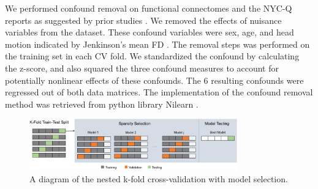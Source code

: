 We performed confound removal on functional connectomes and the NYC-Q reports as suggested by prior studies \cite{Smith2015}.
We removed the effects of nuisance variables from the dataset. These confound variables were sex, age, and head motion indicated by Jenkinson’s mean FD \cite{Jenkinson2002}.%
The removal steps was performed on the training set in each CV fold. We standardized the confound by calculating the z-score, and also squared the three confound measures to account for potentially nonlinear effects of these confounds. The 6 resulting confounds were regressed out of both data matrices. The implementation of the confound removal method \cite{Friston1994}
was retrieved from python library Nilearn \cite[\url{http://nilearn.github.io/}, version 0.3.1]{Abraham2014}.

\begin{figure}
	\centering
	\includegraphics[width=0.8\textwidth]{study2/image/study2fig1.png}
	\caption{A diagram of the nested k-fold cross-validation with model selection.}
	\label{fig:study2:fig1}
\end{figure}

